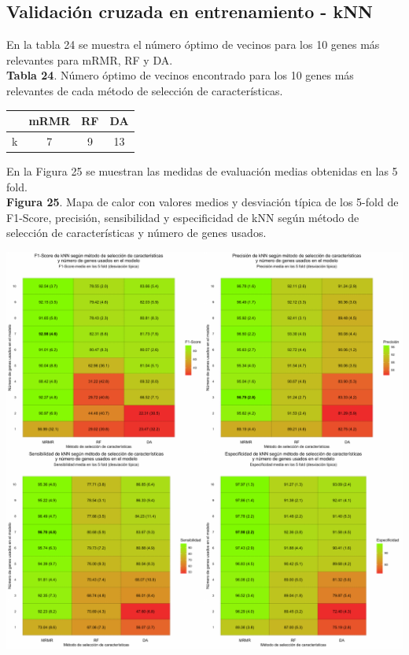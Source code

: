 \subsection{Validación cruzada en entrenamiento - kNN}

En la tabla 24 se muestra el número óptimo de vecinos para los 10 genes más relevantes para mRMR, RF y DA.\\

\textbf{Tabla 24}. Número óptimo de vecinos encontrado para los 10 genes más relevantes de cada método de selección de características.

\begin{table}[H]
	\centering
	\begin{tabular}{cccc}
		\cline{2-4}
		\textbf{} & \textbf{mRMR} & \textbf{RF} & \textbf{DA} \\ \hline
		k                &    7 &   9     &   13      \\ \hline
	\end{tabular}
\end{table}

En la Figura 25 se muestran las medidas de evaluación medias obtenidas en las 5 fold.\\

\newpage
\textbf{Figura 25}. Mapa de calor con valores medios y desviación típica de los 5-fold de F1-Score, precisión, sensibilidad y especificidad de kNN según método de selección de características y número de genes usados.
\begin{center}
	\includegraphics[width=1\textwidth]{figuras/25_higado_multiclase_heatmap_knn.pdf} 
\end{center}

